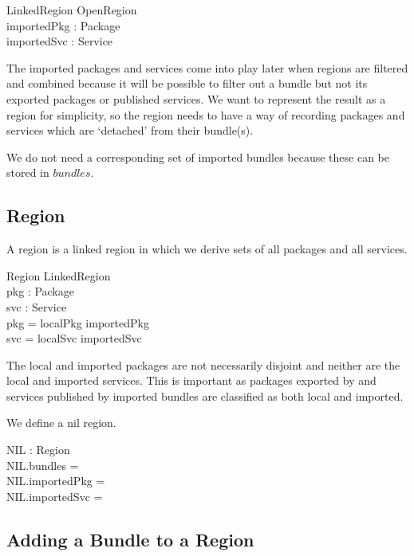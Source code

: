 \documentclass[a4paper,9pt]{article}
\begin{document}
\begin{schema}{LinkedRegion}
  OpenRegion \\
  importedPkg : \power Package \\
  importedSvc : \power Service \\  
\end{schema}
The imported packages and services come into play later when regions are filtered and combined
because it will be possible to filter out a bundle but not its exported packages or published services.
We want to represent the result as a region for simplicity, so the region needs to have a way
of recording packages and services which are `detached' from their bundle(s).

We do not need a corresponding set of imported bundles because these can be stored in $bundles$.

\subsection{Region}

A region is a linked region in which we derive sets of all packages and all services.
\begin{schema}{Region}
  LinkedRegion \\
  pkg : \power Package \\
  svc : \power Service \\
\where
  pkg = localPkg \cup importedPkg \\
  svc = localSvc \cup importedSvc \\
\end{schema}
The local and imported packages are not necessarily disjoint and neither are the local and imported
services. This is important as packages exported by and services published by imported bundles
are classified as both local and imported.

We define a nil region.
\begin{axdef}
  NIL : Region \\
\where
 NIL.bundles = \emptyset \\
 NIL.importedPkg = \emptyset \\
 NIL.importedSvc = \emptyset \\
 \end{axdef}

\subsection{Adding a Bundle to a Region}
\end{document}
